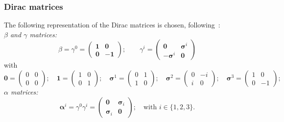 \subsubsection*{Dirac matrices}
The following representation of the Dirac matrices is chosen, following~\cite{greiner2000}:\\
\textit{$\beta$ and $\gamma$ matrices:}\\[-10pt]
\begin{equation}
\beta=\gamma^0 =
\begin{pmatrix}
\boldsymbol{1}&\boldsymbol{0}\\
\boldsymbol{0}&\boldsymbol{-1}
\end{pmatrix};\qquad
\gamma^{i} = 
\begin{pmatrix}
\boldsymbol{0}&\boldsymbol{\sigma}^i\\
-\boldsymbol{\sigma}^i&\boldsymbol{0}
\end{pmatrix}
\end{equation}
with\\[-10pt]
\begin{equation}
\boldsymbol{0}=
\begin{pmatrix}
0&0\\0&0
\end{pmatrix};\quad
\boldsymbol{1}=
\begin{pmatrix}
1&0\\0&1
\end{pmatrix};\quad
\boldsymbol{\sigma}^1=
\begin{pmatrix}
0&1\\1&0
\end{pmatrix};\quad
\boldsymbol{\sigma}^2=
\begin{pmatrix}
0&-i\\i&0
\end{pmatrix};\quad
\boldsymbol{\sigma}^3=
\begin{pmatrix}
1&0\\0&-1
\end{pmatrix};\quad
\end{equation}
\textit{$\alpha$ matrices:}
\begin{equation}
\boldsymbol{\alpha}^i = \gamma^0 \gamma^i =
\begin{pmatrix}
\boldsymbol{0}&\boldsymbol{\sigma}_i\\
\boldsymbol{\sigma}_i&\boldsymbol{0}
\end{pmatrix}
;\quad\text{with }i \in \{1,2,3\}.
\end{equation}

